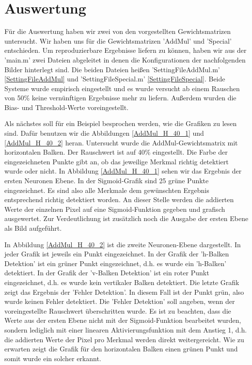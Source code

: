 \newpage
\section{Auswertung}
Für die Auswertung haben wir zwei von den vorgestellten Gewichtsmatrizen untersucht. Wir haben uns für die Gewichtsmatrizen 'AddMul' und 'Special' entschieden. Um reproduzierbare Ergebnisse liefern zu können, haben wir aus der 'main.m' zwei Dateien abgeleitet in denen die Konfigurationen der nachfolgenden Bilder hinterlegt sind. Die beiden Dateien heißen 'SettingFileAddMul.m' \ref{SettingFileAddMul} und 'SettingFileSpecial.m' \ref{SettingFileSpecial}. Beide Systeme wurde empirisch eingestellt und es wurde versucht ab einem Rauschen von 50\% keine vernünftigen Ergebnisse mehr zu liefern. Außerdem wurden die Bias- und Threshold-Werte voreingestellt.

Als nächstes soll für ein Beispiel besprochen werden, wie die Grafiken zu lesen sind. Dafür benutzen wir die Abbildungen \ref{AddMul_H_40_1} und \ref{AddMul_H_40_2} heran. Untersucht wurde die AddMul-Gewichtsmatrix mit horizontalen Balken. Der Rauschwert ist auf 40\% eingestellt. Die Farbe der eingezeichneten Punkte gibt an, ob das jeweilige Merkmal richtig detektiert wurde oder nicht. In Abbildung \ref{AddMul_H_40_1} sehen wir das Ergebnis der ersten Neuronen Ebene. In der Sigmoid-Grafik sind 25 grüne Punkte eingezeichnet. Es sind also alle Merkmale dem gewünschten Ergebnis entsprechend richtig detektiert worden. An dieser Stelle werden die addierten Werte der einzelnen Pixel auf eine Sigmoid-Funktion gegeben und grafisch ausgewertet. Zur Verdeutlichung ist zusätzlich noch die Ausgabe der ersten Ebene als Bild aufgeführt. 

In Abbildung \ref{AddMul_H_40_2} ist die zweite Neuronen-Ebene dargestellt. In jeder Grafik ist jeweils ein Punkt eingezeichnet. In der Grafik der 'h-Balken Detektion' ist ein grüner Punkt eingezeichnet, d.h. es wurde ein 'h-Balken' detektiert. In der Grafik der 'v-Balken Detektion' ist ein roter Punkt eingezeichnet, d.h. es wurde kein vertikaler Balken detektiert. Die letzte Grafik zeigt das Ergebnis der 'Fehler Detektion'. In diesem Fall ist der Punkt grün, also wurde keinen Fehler detektiert. Die 'Fehler Detektion' soll angeben, wenn der voreingestellte Rauschwert überschritten wurde. Es ist zu beachten, dass die Werte aus der ersten Ebene nicht mit der Sigmoid-Funktion bearbeitet wurden, sondern lediglich mit einer linearen Aktivierungsfunktion mit dem Anstieg 1, d.h. die addierten Werte der Pixel pro Merkmal werden direkt weitergereicht. Wie zu erwarten zeigt die Grafik für den horizontalen Balken einen grünen Punkt und somit wurde ein solcher erkannt. 

